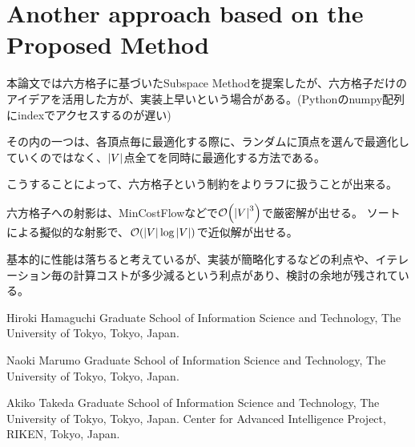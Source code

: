 \documentclass[dvipdfmx,journal]{IEEEtran}
\begin{document}
\section{Another approach based on the Proposed Method}\label{sec:anotherApproach}

本論文では六方格子に基づいたSubspace Methodを提案したが、六方格子だけのアイデアを活用した方が、実装上早いという場合がある。(Pythonのnumpy配列にindexでアクセスするのが遅い)

その内の一つは、各頂点毎に最適化する際に、ランダムに頂点を選んで最適化していくのではなく、$\abs{V}$点全てを同時に最適化する方法である。

こうすることによって、六方格子という制約をよりラフに扱うことが出来る。

六方格子への射影は、MinCostFlowなどで$\order{\abs{V}^3}$で厳密解が出せる。
ソートによる擬似的な射影で、$\order{\abs{V} \log \abs{V}}$で近似解が出せる。

基本的に性能は落ちると考えているが、実装が簡略化するなどの利点や、イテレーション毎の計算コストが多少減るという利点があり、検討の余地が残されている。

\begin{IEEEbiography}{Hiroki Hamaguchi}
  Graduate School of Information Science and Technology, The University of Tokyo, Tokyo, Japan.
\end{IEEEbiography}
\begin{IEEEbiography}{Naoki Marumo}
  Graduate School of Information Science and Technology, The University of Tokyo, Tokyo, Japan.
\end{IEEEbiography}
\begin{IEEEbiography}{Akiko Takeda}
  Graduate School of Information Science and Technology, The University of Tokyo, Tokyo, Japan.
  Center for Advanced Intelligence Project, RIKEN, Tokyo, Japan.
\end{IEEEbiography}
\end{document}
